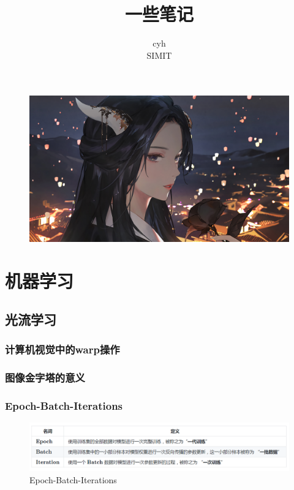\documentclass[cn,hazy,black,normal]{elegantnote}
\title{一些笔记}
\author{cyh \\ 
	SIMIT}
\date{\zhtoday}
\numberwithin{equation}{section}
\numberwithin{figure}{section}
\begin{document}
	\maketitle
	
	\begin{figure}[H]
		\centering
		\includegraphics[width=.85\linewidth]{images/girl.jpg}
		\label{girl}
	\end{figure}
	
	\newpage
	
	\tableofcontents
	
	\newpage
	
	\section{机器学习}
		\subsection{光流学习}
			\subsubsection{计算机视觉中的warp操作}
		
			\subsubsection{图像金字塔的意义}
			
			\subsubsection{Epoch-Batch-Iterations}
				\begin{figure}[H]
					\centering
					\includegraphics[width=.95\linewidth]{images/epoch-batch-iteration.png}
					\caption{{\rm Epoch-Batch-Iterations}}
					\label{Epoch-Batch-Iterations}
				\end{figure}
		
\end{document}
